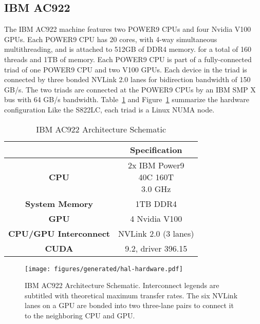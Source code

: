 \subsection{IBM AC922}
\label{sec:ac922}

The IBM AC922 machine features two POWER9 CPUs and four Nvidia V100 GPUs\cite{caldeira2018ac922}.
Each POWER9 CPU has 20 cores, with 4-way simultaneous multithreading, and is attached to 512GB of DDR4 memory. for a total of 160 threads and 1TB of memory.
Each POWER9 CPU is part of a fully-connected triad of one POWER9 CPU and two V100 GPUs.
Each device in the triad is connected by three bonded NVLink 2.0 lanes for bidirection bandwidth of 150 GB/s.
The two triads are connected at the POWER9 CPUs by an IBM SMP X bus with 64 GB/s bandwidth.
Table~\ref{tab:ac922} and Figure~\ref{fig:topo-ac922-simple} summarize the hardware configuration
Like the S822LC, each triad is a Linux NUMA node.

\begin{table}[ht]
    \centering
    \caption[IBM AC922 Architecture Summary]{IBM AC922 Architecture Schematic}
    \label{tab:ac922}
    \begin{tabular}{cc}
    \hline
    \textbf{}                      & \textbf{Specification}                           \\ \hline
    \textbf{CPU}                   & \makecell{2x IBM Power9 \\ 40C 160T \\ 3.0 GHz } \\ \hline
    \textbf{System Memory}         & 1TB DDR4                                         \\ \hline
	\textbf{GPU}                   & 4 Nvidia V100                                    \\ \hline
	\textbf{CPU/GPU Interconnect}  & NVLink 2.0 (3 lanes)                             \\ \hline
	\textbf{CUDA}                  & 9.2, driver 396.15                               \\ \hline
    \end{tabular}
\end{table}

\begin{figure}
    \centering
	\texttt{[image: figures/generated/hal-hardware.pdf]}
    \caption[IBM AC922 Architecture Schematic]{
		IBM AC922 Architecture Schematic.
		Interconnect legends are subtitled with theoretical maximum transfer rates.
		The six NVLink lanes on a GPU are bonded into two three-lane pairs to connect it to the neighboring CPU and GPU.
	}
    \label{fig:topo-ac922-simple}
\end{figure}
